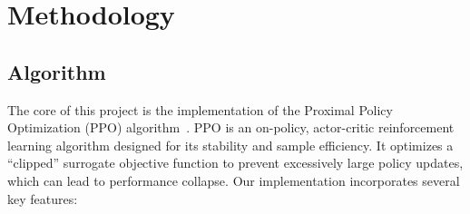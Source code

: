 \section{Methodology}\label{sec:methodology}
\subsection{Algorithm}
The core of this project is the implementation of the Proximal Policy Optimization (PPO) algorithm~\cite{schulman2017proximal}. PPO is an on-policy, actor-critic reinforcement learning algorithm designed for its stability and sample efficiency. It optimizes a ``clipped'' surrogate objective function to prevent excessively large policy updates, which can lead to performance collapse. Our implementation incorporates several key features:

